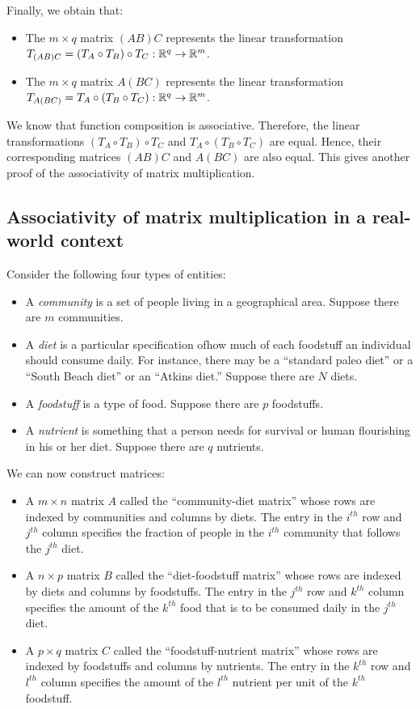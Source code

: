 \documentclass[10pt]{amsart}
\begin{document}
Finally, we obtain that:

\begin{itemize}
\item The $m \times q$ matrix $(AB)C$ represents the linear
  transformation $T_{(AB)C} = (T_A \circ T_B) \circ T_C: \mathbb{R}^q \to
  \mathbb{R}^m$.
\item The $m \times q$ matrix $A(BC)$ represents the linear
  transformation $T_{A(BC)} = T_A \circ (T_B \circ T_C): \mathbb{R}^q \to
  \mathbb{R}^m$.
\end{itemize}

We know that function composition is associative. Therefore, the
linear transformations $(T_A \circ T_B) \circ T_C$ and $T_A \circ (T_B
\circ T_C)$ are equal. Hence, their corresponding matrices $(AB)C$ and
$A(BC)$ are also equal. This gives another proof of the associativity
of matrix multiplication.

\subsection{Associativity of matrix multiplication in a real-world context}

Consider the following four types of entities:

\begin{itemize}
\item A {\em community} is a set of people living in a geographical
  area. Suppose there are $m$ communities.
\item A {\em diet} is a particular specification ofhow much of each
  foodstuff an individual should consume daily. For instance, there
  may be a ``standard paleo diet'' or a ``South Beach diet'' or an
  ``Atkins diet.'' Suppose there are $N$ diets.
\item A {\em foodstuff} is a type of food. Suppose there are $p$
  foodstuffs.
\item A {\em nutrient} is something that a person needs for survival
  or human flourishing in his or her diet. Suppose there are $q$ nutrients.
\end{itemize}

We can now construct matrices:

\begin{itemize}
\item A $m \times n$ matrix $A$ called the ``community-diet matrix''
  whose rows are indexed by communities and columns by diets. The
  entry in the $i^{th}$ row and $j^{th}$ column specifies the fraction
  of people in the $i^{th}$ community that follows the $j^{th}$ diet.
\item A $n \times p$ matrix $B$ called the ``diet-foodstuff matrix''
  whose rows are indexed by diets and columns by foodstuffs. The entry
  in the $j^{th}$ row and $k^{th}$ column specifies the amount of the
  $k^{th}$ food that is to be consumed daily in the $j^{th}$ diet.
\item A $p \times q$ matrix $C$ called the ``foodstuff-nutrient
  matrix'' whose rows are indexed by foodstuffs and columns by
  nutrients. The entry in the $k^{th}$ row and $l^{th}$ column
  specifies the amount of the $l^{th}$ nutrient per unit of the
  $k^{th}$ foodstuff.
\end{itemize}
\end{document}
